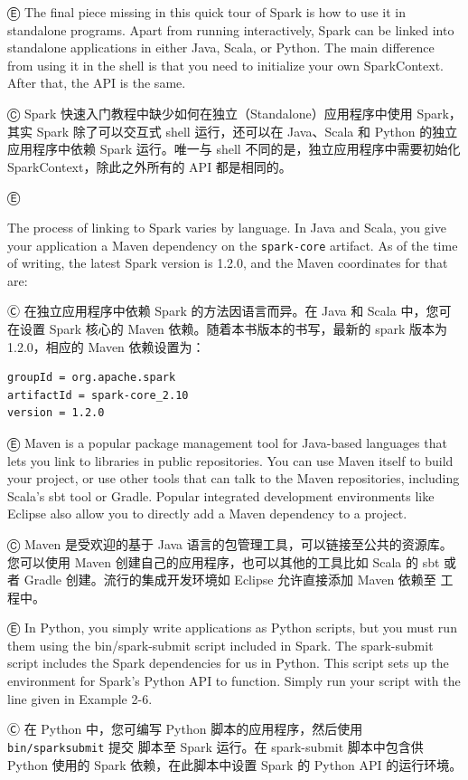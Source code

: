 Ⓔ \textcolor{etc}{The final piece missing in this quick tour of Spark is how to use it in standalone programs. Apart from running interactively, Spark can be linked into standalone applications in either Java, Scala, or Python. The main difference from using it in the shell is that you need to initialize your own SparkContext. After that, the API is the same.}

Ⓒ Spark 快速入门教程中缺少如何在独立（Standalone）应用程序中使用
Spark，其实 Spark 除了可以交互式 shell 运行，还可以在 Java、Scala 和
Python 的独立应用程序中依赖 Spark 运行。唯一与 shell
不同的是，独立应用程序中需要初始化 SparkContext，除此之外所有的 API
都是相同的。

Ⓔ \textcolor{etc}{The process of linking to Spark varies by language. In Java and Scala, you give your application a Maven dependency on the \lstinline{spark-core} artifact. As of the time of writing, the latest Spark version is 1.2.0, and the Maven coordinates for that are:

Ⓒ 在独立应用程序中依赖 Spark 的方法因语言而异。在 Java 和 Scala
中，您可在设置 Spark 核心的 Maven 依赖。随着本书版本的书写，最新的 spark
版本为 1.2.0，相应的 Maven 依赖设置为：

\begin{lstlisting}
groupId = org.apache.spark
artifactId = spark-core_2.10
version = 1.2.0
\end{lstlisting}

Ⓔ \textcolor{etc}{Maven is a popular package management tool for Java-based languages that lets you link to libraries in public repositories. You can use Maven itself to build your project, or use other tools that can talk to the Maven repositories, including Scala's sbt tool or Gradle. Popular integrated development environments like Eclipse also allow you to directly add a Maven dependency to a project.}

Ⓒ Maven 是受欢迎的基于 Java 语言的包管理工具，可以链接至公共的资源库。您可以使用 Maven
创建自己的应用程序，也可以其他的工具比如 Scala 的 sbt 或者 Gradle
创建。流行的集成开发环境如 Eclipse 允许直接添加 Maven 依赖至 工程中。

Ⓔ \textcolor{etc}{In Python, you simply write applications as Python scripts, but you must run them using the bin/spark-submit script included in Spark. The spark-submit script includes the Spark dependencies for us in Python. This script sets up the environment for Spark's Python API to function. Simply run your script with the line given in Example 2-6.}

Ⓒ 在 Python 中，您可编写 Python 脚本的应用程序，然后使用
\lstinline{bin/sparksubmit} 提交 脚本至 Spark 运行。在 spark-submit
脚本中包含供 Python 使用的 Spark 依赖，在此脚本中设置 Spark 的 Python
API 的运行环境。

}
